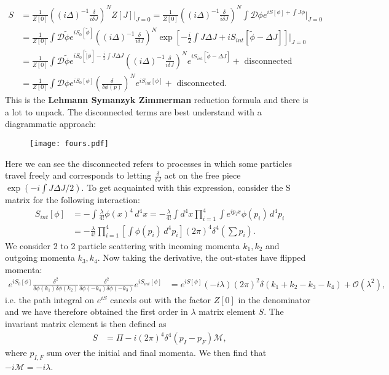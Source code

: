\documentclass[a4paper, 11pt, normalem]{report}
\begin{document}
\begin{align}
    S &= \frac{1}{Z[0]}\left((i\Delta)^{-1}\frac{\delta}{i\delta J}\right)^NZ[J]\bigg|_{J=0} = \frac{1}{Z[0]}\left((i\Delta)^{-1}\frac{\delta}{i\delta J}\right)^N \int \mathcal{D}\phi e^{iS[\phi]+\int J\phi}\bigg|_{J=0} \\
      &= \frac{1}{Z[0]}\int \mathcal{D}\tilde{\phi}e^{iS_0[\tilde{\phi}]}\left((i\Delta)^{-1}\frac{\delta}{i\delta J}\right)^N \exp\left[-\frac{i}{2}\int J\Delta J + iS_{int}[\tilde{\phi}-\Delta J]\right]\bigg|_{J=0} \\
      &= \frac{1}{Z[0]}\int \mathcal{D}\tilde{\phi}e^{iS_0[\tilde[\phi]-\frac{i}{2}\int J\Delta J} \left((i\Delta)^{-1}\frac{\delta}{i\delta J}\right)^N e^{iS_{int}[\tilde{\phi}-\Delta J]}+\text{ disconnected} \\
      &= \frac{1}{Z[0]}\int \mathcal{D}\phi e^{iS_0[\phi]}\left(\frac{\delta}{\delta\phi(p)}\right)^Ne^{iS_{int}[\phi]}+\text{ disconnected}.
\end{align}
This is the \textbf{Lehmann Symanzyk Zimmerman} reduction formula and there is a lot to unpack.
The disconnected terms are best understand with a diagrammatic approach:
\begin{figure}[H]
    \centering
    \texttt{[image: fours.pdf]}
\end{figure}
Here we can see the disconnected refers to processes in which some particles travel freely and corresponds to letting $\frac{\delta}{\delta J}$ act on the free piece $\exp\left(-i\int J\Delta J/2\right)$.
To get acquainted with this expression, consider the S matrix for the following interaction:
\begin{align}
    S_{int}[\phi] &= -\int \frac{\lambda}{4!}\phi(x)^4\,d^4x = -\frac{\lambda}{4!}\int d^4x \prod_{i=1}^4 \int e^{ip_ix}\phi(p_i)\,d^4p_i \\
                  &= -\frac{\lambda}{4!}\prod_{i=1}^4 \left[\int \phi(p_i)\,d^4p_i\right](2\pi)^4\delta^4\left(\sum p_i\right).
\end{align}
We consider 2 to 2 particle scattering with incoming momenta $k_1,k_2$ and outgoing momenta $k_3,k_4$.
Now taking the derivative, the out-states have flipped momenta:
\begin{align}
    e^{iS_0[\phi]}\frac{\delta^2}{\delta\phi(k_1)\delta\phi(k_2)}\frac{\delta^2}{\delta\phi(-k_4)\delta\phi(-k_3)}e^{iS_{int}[\phi]} &= e^{iS[\phi]}(-i\lambda)(2\pi)^2\delta(k_1+k_2-k_3-k_4)+\mathcal{O}(\lambda^2),
\end{align}
i.e. the path integral on $e^{iS}$ cancels out with the factor $Z[0]$ in the denominator and we have therefore obtained the first order in $\lambda$ matrix element $S$.
The invariant matrix element is then defined as
\begin{align}
    S &= \Pi - i(2\pi)^4\delta^4(p_I-p_F)\mathcal{M},
\end{align}
where $p_{I,F}$ sum over the initial and final momenta.
We then find that $-i\mathcal{M}=-i\lambda$.
\end{document}
